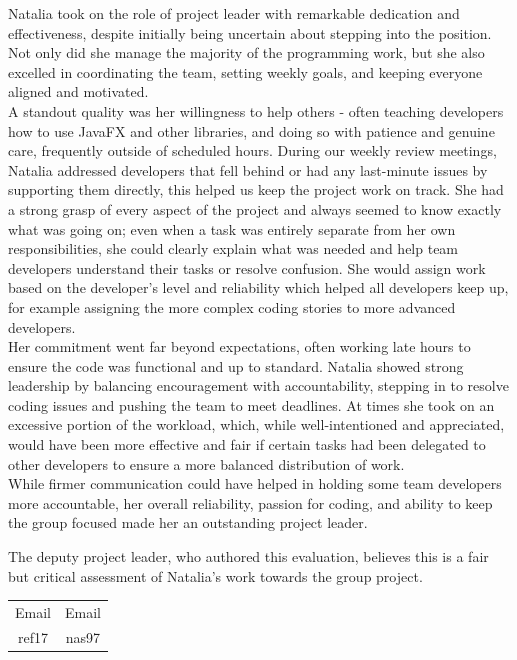 \documentclass[a4paper]{project}
\begin{document}
			Natalia took on the role of project leader with remarkable dedication and effectiveness, despite initially being uncertain about stepping into the position. Not only did she manage the majority of the programming work, but she also excelled in coordinating the team, setting weekly goals, and keeping everyone aligned and motivated. \\
			A standout quality was her willingness to help others - often teaching developers how to use JavaFX and other libraries, and doing so with patience and genuine care, frequently outside of scheduled hours. During our weekly review meetings, Natalia addressed developers that fell behind or had any last-minute issues by supporting them directly, this helped us keep the project work on track.  She had a strong grasp of every aspect of the project and always seemed to know exactly what was going on; even when a task was entirely separate from her own responsibilities, she could clearly explain what was needed and help team developers understand their tasks or resolve confusion. She would assign work based on the developer’s level and reliability which helped all developers keep up, for example assigning the more complex coding stories to more advanced developers. \\
			Her commitment went far beyond expectations, often working late hours to ensure the code was functional and up to standard. Natalia showed strong leadership by balancing encouragement with accountability, stepping in to resolve coding issues and pushing the team to meet deadlines. At times she took on an excessive portion of the workload, which, while well-intentioned and appreciated, would have been more effective and fair if certain tasks had been delegated to other developers to ensure a more balanced distribution of work. \\
			While firmer communication could have helped in holding some team developers more accountable, her overall reliability, passion for coding, and ability to keep the group focused made her an outstanding project leader.
			
			The deputy project leader, who authored this evaluation, believes this is a fair but critical assessment of Natalia's work towards the group project.
			
			\begin{center}
				\setlength{\tabcolsep}{0.1\paperwidth}
				\begin{tabular}{c c}
					Email & Email \\
					ref17 & nas97
				\end{tabular}
			\end{center}
			
\end{document}

